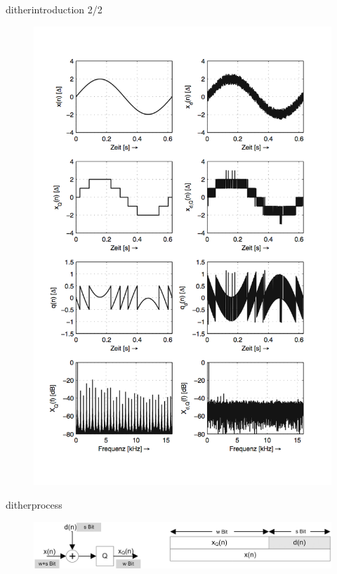 	\begin{frame}{dither}{introduction 2/2}
		\vspace{-5mm}
        \begin{figure}
			\centering
				\includegraphics[scale=0.4]{Graph/3stepquantdither.png}
		\end{figure}
	\end{frame}	
	\begin{frame}{dither}{process}
		\begin{figure}
			\centering
				\includegraphics[scale=0.9]{Graph/quantisierung_mit_dither.png}
		\end{figure}
	\end{frame}	
